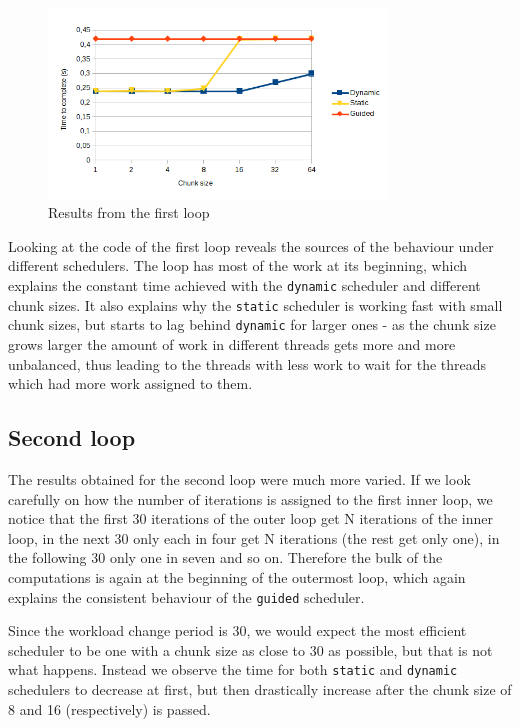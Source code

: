 \documentclass[11pt,a4paper]{article}
\begin{document}
\begin{figure}[h!]
    \begin{center}
        \includegraphics[width=0.8\textwidth]{loop1.png}
    \end{center}
    \caption{Results from the first loop}
    \label{loop1}
\end{figure}

Looking at the code of the first loop reveals the sources of the behaviour under different schedulers. The loop has most of the work at its beginning, which explains the constant time achieved with the \texttt{dynamic} scheduler and different chunk sizes. It also explains why the \texttt{static} scheduler is working fast with small chunk sizes, but starts to lag behind \texttt{dynamic} for larger ones - as the chunk size grows larger the amount of work in different threads gets more and more unbalanced, thus leading to the threads with less work to wait for the threads which had more work assigned to them.

\subsection{Second loop}
The results obtained for the second loop were much more varied. If we look carefully on how the number of iterations is assigned to the first inner loop, we notice that the first 30 iterations of the outer loop get N iterations of the inner loop, in the next 30 only each in four get N iterations (the rest get only one), in the following 30 only one in seven and so on. Therefore the bulk of the computations is again at the beginning of the outermost loop, which again explains the consistent behaviour of the \texttt{guided} scheduler. 

Since the workload change period is 30, we would expect the most efficient scheduler to be one with a chunk size as close to 30 as possible, but that is not what happens. Instead we observe the time for both \texttt{static} and \texttt{dynamic} schedulers to decrease at first, but then drastically increase after the chunk size of 8 and 16 (respectively) is passed. 
\end{document}
